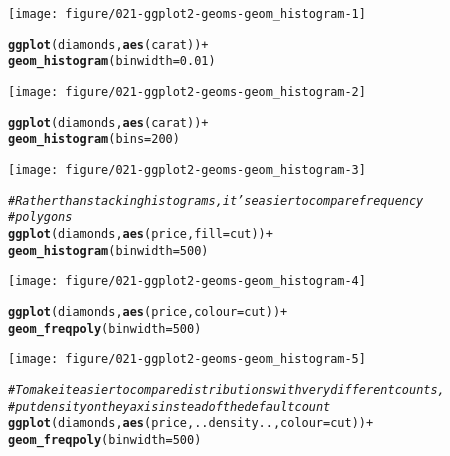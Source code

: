 \documentclass[a4paper,titlepage]{tufte-handout}\usepackage[]{graphicx}\usepackage[]{color}
\makeatletter
\def\maxwidth{ %
  \ifdim\Gin@nat@width>\linewidth
    \linewidth
  \else
    \Gin@nat@width
  \fi
}
\newcommand{\hlnum}[1]{\textcolor[rgb]{0.686,0.059,0.569}{#1}}%
\newcommand{\hlcom}[1]{\textcolor[rgb]{0.678,0.584,0.686}{\textit{#1}}}%
\newcommand{\hlopt}[1]{\textcolor[rgb]{0,0,0}{#1}}%
\newcommand{\hlstd}[1]{\textcolor[rgb]{0.345,0.345,0.345}{#1}}%
\newcommand{\hlkwc}[1]{\textcolor[rgb]{0.333,0.667,0.333}{#1}}%
\newcommand{\hlkwd}[1]{\textcolor[rgb]{0.737,0.353,0.396}{\textbf{#1}}}%
\newenvironment{kframe}{%
 \def\at@end@of@kframe{}%
 \ifinner\ifhmode%
  \def\at@end@of@kframe{\end{minipage}}%
  \begin{minipage}{\columnwidth}%
 \fi\fi%
 \def\FrameCommand##1{\hskip\@totalleftmargin \hskip-\fboxsep
 \colorbox{shadecolor}{##1}\hskip-\fboxsep
     \hskip-\linewidth \hskip-\@totalleftmargin \hskip\columnwidth}%
 \MakeFramed {\advance\hsize-\width
   \@totalleftmargin\z@ \linewidth\hsize
   \@setminipage}}%
 {\par\unskip\endMakeFramed%
 \at@end@of@kframe}
\newenvironment{knitrout}{}{} %
\makeatother
\begin{document}
\begin{knitrout}
\begin{kframe}
{\ttfamily\noindent\itshape\color{messagecolor}{\#\# `stat\_bin()` using `bins = 30`. Pick better value with `binwidth`.}}\end{kframe}
\texttt{[image: figure/021-ggplot2-geoms-geom\_histogram-1]} 
\begin{kframe}\begin{alltt}
\hlkwd{ggplot}\hlstd{(diamonds,} \hlkwd{aes}\hlstd{(carat))} \hlopt{+}
  \hlkwd{geom_histogram}\hlstd{(}\hlkwc{binwidth} \hlstd{=} \hlnum{0.01}\hlstd{)}
\end{alltt}
\end{kframe}
\texttt{[image: figure/021-ggplot2-geoms-geom\_histogram-2]} 
\begin{kframe}\begin{alltt}
\hlkwd{ggplot}\hlstd{(diamonds,} \hlkwd{aes}\hlstd{(carat))} \hlopt{+}
  \hlkwd{geom_histogram}\hlstd{(}\hlkwc{bins} \hlstd{=} \hlnum{200}\hlstd{)}
\end{alltt}
\end{kframe}
\texttt{[image: figure/021-ggplot2-geoms-geom\_histogram-3]} 
\begin{kframe}\begin{alltt}
\hlcom{# Rather than stacking histograms, it's easier to compare frequency}
\hlcom{# polygons}
\hlkwd{ggplot}\hlstd{(diamonds,} \hlkwd{aes}\hlstd{(price,} \hlkwc{fill} \hlstd{= cut))} \hlopt{+}
  \hlkwd{geom_histogram}\hlstd{(}\hlkwc{binwidth} \hlstd{=} \hlnum{500}\hlstd{)}
\end{alltt}
\end{kframe}
\texttt{[image: figure/021-ggplot2-geoms-geom\_histogram-4]} 
\begin{kframe}\begin{alltt}
\hlkwd{ggplot}\hlstd{(diamonds,} \hlkwd{aes}\hlstd{(price,} \hlkwc{colour} \hlstd{= cut))} \hlopt{+}
  \hlkwd{geom_freqpoly}\hlstd{(}\hlkwc{binwidth} \hlstd{=} \hlnum{500}\hlstd{)}
\end{alltt}
\end{kframe}
\texttt{[image: figure/021-ggplot2-geoms-geom\_histogram-5]} 
\begin{kframe}\begin{alltt}
\hlcom{# To make it easier to compare distributions with very different counts,}
\hlcom{# put density on the y axis instead of the default count}
\hlkwd{ggplot}\hlstd{(diamonds,} \hlkwd{aes}\hlstd{(price, ..density..,} \hlkwc{colour} \hlstd{= cut))} \hlopt{+}
  \hlkwd{geom_freqpoly}\hlstd{(}\hlkwc{binwidth} \hlstd{=} \hlnum{500}\hlstd{)}

\end{alltt}
\end{kframe}
\end{knitrout}
\end{document}
